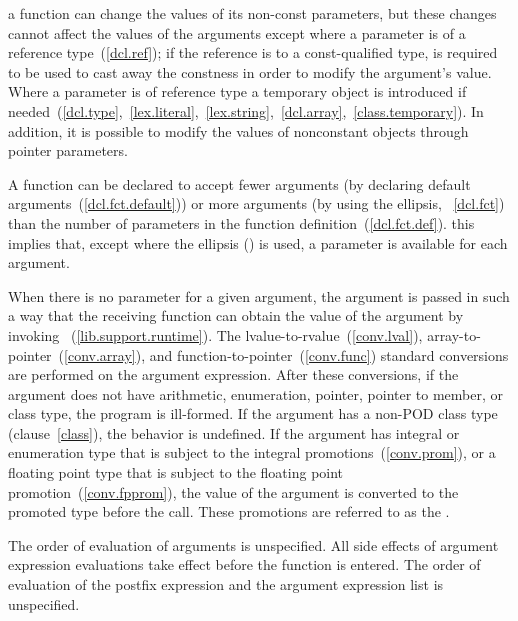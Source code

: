 \pnum
\enternote 
{}%
%
%
%
%
%
a function can change the values of its non-const parameters, but these
changes cannot affect the values of the arguments except where a
parameter is of a reference type~(\ref{dcl.ref}); if the reference is to
a const-qualified type,  is required to be used to
cast away the constness in order to modify the argument's value. Where a
parameter is of  reference type a temporary object is
introduced if
needed~(\ref{dcl.type},~\ref{lex.literal},~\ref{lex.string},~\ref{dcl.array},~\ref{class.temporary}).
In addition, it is possible to modify the values of nonconstant objects through
pointer parameters.
\exitnote 

\pnum
{}%
%
A function can be declared to accept fewer arguments (by declaring default
arguments~(\ref{dcl.fct.default})) or more arguments (by using the ellipsis,
~\ref{dcl.fct}) than the number of
parameters in the function definition~(\ref{dcl.fct.def}).
\enternote 
this implies that, except where the ellipsis () is used,
a parameter is available for each argument.
\exitnote 

\pnum
{}%
When there is no parameter for a given argument, the argument is passed
in such a way that the receiving function can obtain the value of the
argument by invoking ~(\ref{lib.support.runtime}). The
lvalue-to-rvalue~(\ref{conv.lval}), array-to-pointer~(\ref{conv.array}),
and function-to-pointer~(\ref{conv.func}) standard conversions are
performed on the argument expression. After these conversions, if the
argument does not have arithmetic, enumeration, pointer, pointer to
member, or class type, the program is ill-formed. If the argument has
a non-POD class type (clause~\ref{class}), the behavior is undefined.
If the argument has integral or enumeration type that is subject to the integral
promotions~(\ref{conv.prom}), or a floating point type that is subject to the floating
point promotion~(\ref{conv.fpprom}), the value of the argument is converted to the
promoted type before the call. These promotions are referred to as the .

\pnum
{}%
%
The order of evaluation of arguments is unspecified. All side effects
of argument expression evaluations take effect before the function is
entered. The order of evaluation of the postfix expression and the
argument expression list is unspecified.

